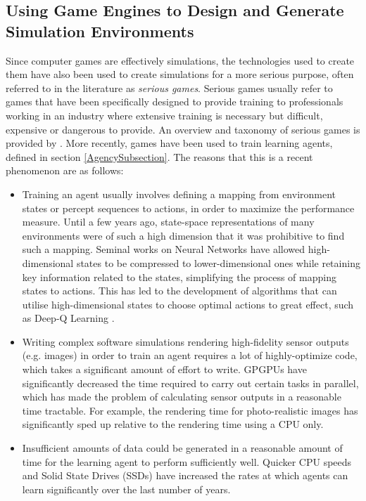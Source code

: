 \subsection{Using Game Engines to Design and Generate Simulation Environments}\label{GameEngineReview}
Since computer games are effectively simulations, the technologies used to create them have also been used to create simulations for a more serious purpose, often referred to in the literature as \textit{serious games}. Serious games usually refer to games that have been specifically designed to provide training to professionals working in an industry where extensive training is necessary but difficult, expensive or dangerous to provide. An overview and taxonomy of serious games is provided by \citeauthor{Laamarti2014AnGames} \cite{Laamarti2014AnGames}. More recently, games have been used to train learning agents, defined in section \ref{AgencySubsection}. The reasons that this is a recent phenomenon are as follows:
\begin{itemize}
    \item
    Training an agent usually involves defining a mapping from environment states or percept sequences to actions, in order to maximize the performance measure. Until a few years ago, state-space representations of many environments were of such a high dimension that it was prohibitive to find such a mapping. Seminal works on Neural Networks \cite{Lecun1998Gradient-BasedRecognition} \cite{Krizhevsky2012ImageNetNetworks} have allowed high-dimensional states to be compressed to lower-dimensional ones while retaining key information related to the states, simplifying the process of mapping states to actions. This has led to the development of algorithms that can utilise high-dimensional states to choose optimal actions to great effect, such as Deep-Q Learning \cite{Mnih2013PlayingLearning}.
    \item Writing complex software simulations rendering high-fidelity sensor outputs (e.g. images) in order to train an agent requires a lot of highly-optimize code, which takes a significant amount of effort to write.
    GPGPUs have significantly decreased the time required to carry out certain tasks in parallel, which has made the problem of calculating sensor outputs in a reasonable time tractable. For example, the rendering time for photo-realistic images has significantly sped up relative to the rendering time using a CPU only. 
    \item Insufficient amounts of data could be generated in a reasonable amount of time for the learning agent to perform sufficiently well. Quicker CPU speeds and Solid State Drives (SSDs) have increased the rates at which agents can learn significantly over the last number of years.
\end{itemize}

